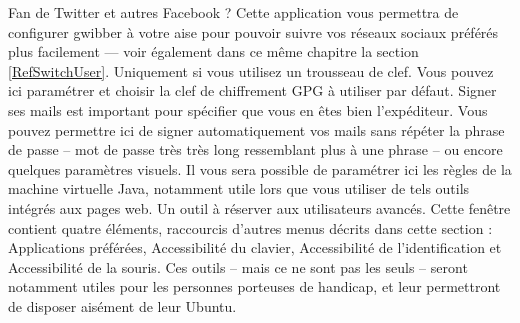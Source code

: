 Fan de Twitter et autres Facebook ? Cette application vous permettra de configurer gwibber à votre aise pour pouvoir suivre vos réseaux sociaux préférés plus facilement --- voir également dans ce même chapitre la section \ref{RefSwitchUser}.
Uniquement si vous utilisez un trousseau de clef. Vous pouvez ici paramétrer et choisir la clef de chiffrement GPG à utiliser par défaut. Signer ses mails est important pour spécifier que vous en êtes bien l'expéditeur. Vous pouvez permettre ici de signer automatiquement vos mails sans répéter la phrase de passe -- mot de passe très très long ressemblant plus à une phrase -- ou encore quelques paramètres visuels.
{}
Il vous sera possible de paramétrer ici les règles de la machine virtuelle Java, notamment utile lors que vous utiliser de tels outils intégrés aux pages web. Un outil à réserver aux utilisateurs avancés.
Cette fenêtre contient quatre éléments, raccourcis d'autres menus décrits dans cette section : Applications préférées, Accessibilité du clavier, Accessibilité de l'identification et Accessibilité de la souris. Ces outils -- mais ce ne sont pas les seuls -- seront notamment utiles pour les personnes porteuses de handicap, et leur permettront de disposer aisément de leur Ubuntu.
